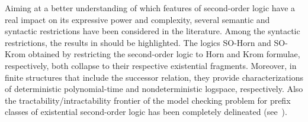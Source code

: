 \documentclass{article}
\begin{document}
Aiming at a better understanding of which features of second-order logic have a real impact on its expressive power and complexity, several semantic and syntactic restrictions have been considered in the literature. Among the syntactic restrictions, the results in \cite{Gradel92} should be highlighted. The logics SO-Horn and SO-Krom obtained by restricting the second-order logic to Horn and Krom formulae, respectively, both collapse to their respective existential fragments. Moreover, in finite structures that include the successor relation, they provide characterizations of deterministic polynomial-time and nondeterministic logspace, respectively. Also
the tractability/intractability frontier of the model checking problem for prefix classes of
existential second-order logic has been completely delineated (see~\cite{EiterGS01,EiterGG00,GottlobKS04}).
\end{document}
